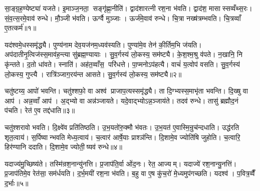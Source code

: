 

\clearpage
{}
\setcounter{anuvakam}{0}
सा॒ङ्ग्र॒ह॒ण्येष्ट्या॑ यजते। इ॒माञ्ज॒नता॒ सङ्गृ॑ह्णा॒नीति॑। द्वाद॑शारत्नी रश॒ना भ॑वति। द्वाद॑श॒ मासास्सव्वँथ्स॒रः। सं॒व॒त्स॒रमे॒वाव॑ रुन्धे। मौ॒ञ्जी भ॑वति। ऊर्ग्वै मुञ्जाः। ऊर्ज॑मे॒वाव॑ रुन्धे। चि॒त्रा नख्ष॑त्रम्भवति। चि॒त्रव्वाँ ए॒तत्कर्म॑॥१॥

यद॑श्वमे॒धस्समृ॑द्ध्यै। पुण्य॑नाम देव॒यज॑नम॒ध्यव॑स्यति। पुण्या॑मे॒व तेन॑ की॒र्तिम॒भि ज॑यति। अप॑दातीनृ॒त्विज॑स्स॒माव॑ह॒न्त्या सु॑ब्रह्म॒ण्यायाः। सु॒व॒र्गस्य॑ लो॒कस्य॒ सम॑ष्ट्यै। के॒श॒श्म॒श्रु व॑पते। न॒खानि॒ नि कृ॑न्तते। द॒तो धा॑वते। स्नाति॑। अह॑त॒व्वाँस॒ परि॑धत्ते। पा॒प्मनोऽप॑हत्यै। वाचं॑ य॒त्वोप॑ वसति। सु॒व॒र्गस्य॑ लो॒कस्य॒ गुप्त्यै। रात्रि॑ञ्जाग॒रय॑न्त आसते। सु॒व॒र्गस्य॑ लो॒कस्य॒ सम॑ष्ट्यै॥२॥\anuvakamend[कर्म॑ धत्ते॒ पञ्च॑ च]

चतु॑ष्टय्य॒ आपो॑ भवन्ति। चतु॑श्शफो॒ वा अश्व॑ प्राजाप॒त्यस्समृ॑द्ध्यै। ता दि॒ग्भ्यस्स॒माभृ॑ता भवन्ति। दि॒ख्षु वा आप॑। अन्न॒व्वाँ आप॑। अ॒द्भ्यो वा अन्न॑ञ्जायते। यदे॒वाद्भ्योऽन्न॒ञ्जाय॑ते। तदव॑ रुन्धे। तासु॑ ब्रह्मौद॒नं प॑चति। रेत॑ ए॒व तद्द॑धाति॥३॥

चतु॑श्शरावो भवति। दि॒क्ष्वे॑व प्रति॑तिष्ठति। उ॒भ॒यतो॑रु॒क्मौ भ॑वतः। उ॒भ॒यत॑ ए॒वास्मि॒न्रुच॑न्दधाति। उद्ध॑रति शृत॒त्वाय॑। स॒र्पिष्वान्भवति मेध्य॒त्वाय॑। च॒त्वार॑ आर्\mbox{}षे॒याः प्राश्ञ॑न्ति। दि॒शामे॒व ज्योति॑षि जुहोति। च॒त्वारि॒ हिर॑ण्यानि ददाति। दि॒शामे॒व ज्योती॒ष्यव॑ रुन्धे॥४॥

यदाज्य॑मु॒च्छिष्य॑ते। तस्मि॑न्रश॒नान्यु॑नत्ति। प्र॒जाप॑ति॒र्वा ओ॑द॒नः। रेत॒ आज्यम्। यदाज्ये॑ रश॒नान्यु॒नत्ति॑। प्र॒जाप॑तिमे॒व रेत॑सा॒ सम॑र्धयति। द॒र्भ॒मयी॑ रश॒ना भ॑वति। ब॒हु वा ए॒ष कु॑च॒रो॑ मे॒ध्यमुप॑गच्छति। यदश्व॑। प॒वित्र॒व्वैँ द॒र्भाः॥५॥

